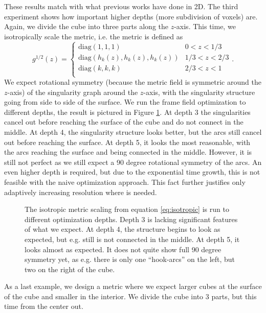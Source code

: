 \documentclass[../thesis.tex]{subfiles}
\begin{document}
These results match with what previous works have done in 2D.
The third experiment shows how important higher depths (more subdivision of voxels) are.
Again, we divide the cube into three parts along the $z$-axis.
This time, we isotropically scale the metric, i.e. the metric is defined as
\begin{equation}\label{eq:isotropic} 
g^{1/2}(z) = \begin{cases}
    \mathrm{diag}(1,1,1) &0 < z < 1/3 \\
    \mathrm{diag}(h_k(z), h_k(z), h_k(z)) &1/3 < z < 2/3 \\
    \mathrm{diag}(k,k,k) &2/3 < z < 1 \\
\end{cases}.\end{equation}
We expect rotational symmetry (because the metric field is symmetric around the $z$-axis) of the singularity graph around the $z$-axis,
with the singularity structure going from side to side of the surface. We run the frame field optimization to different
depths, the result is pictured in Figure \ref{fig:isotropic}. At depth 3 the singularities
cancel out before reaching the surface of the cube and do not connect in the middle. At depth 4, the singularity structure
looks better, but the arcs still cancel out before reaching the surface. At depth 5, it looks
the most reasonable, with the arcs reaching the surface and being connected in the middle.
However, it is still not perfect as we still expect a 90 degree rotational symmetry of the arcs.
An even higher depth is required, but due to the exponential time growth, this is not feasible
with the naive optimization approach. This fact further justifies only adaptively increasing resolution where is needed.
\begin{figure}[htb]
    \centering
    \def\svgwidth{\textwidth}
    
    \caption{The isotropic metric scaling from equation \ref{eq:isotropic} is run to different optimization depths.
    Depth 3 is lacking significant features of what we expect. At depth 4, the structure begins to look as expected, but e.g. still is not connected in the middle.
    At depth 5, it looks almost as expected. It does not quite show full 90 degree symmetry yet, as e.g. there is only one ``hook-arcs'' on the left, but two on the right of the cube.}
    \label{fig:isotropic}
\end{figure}
As a last example, we design a metric where we expect larger cubes at the surface of the cube and smaller in the interior.
We divide the cube into 3 parts, but this time from the center out.
\end{document}
